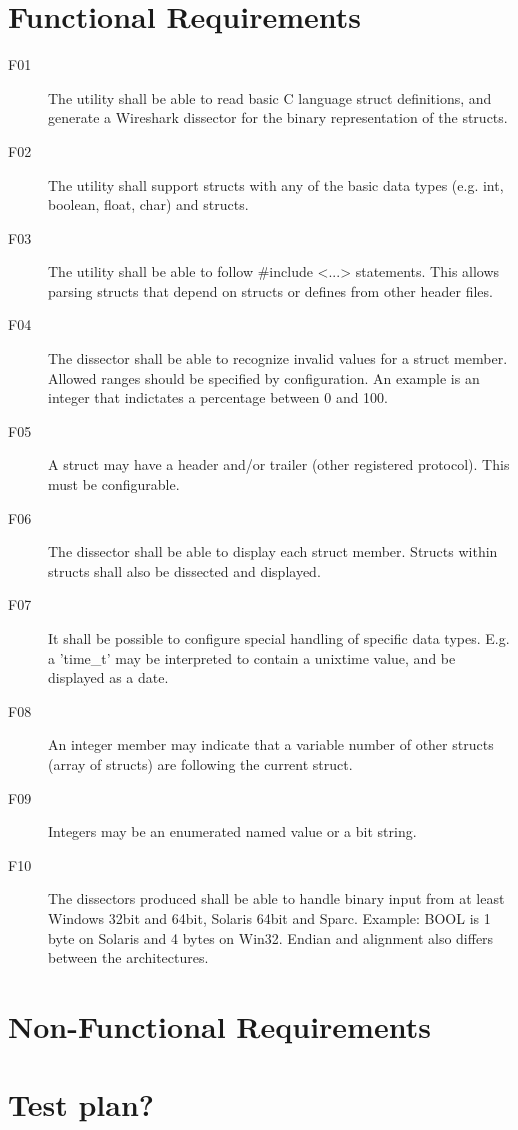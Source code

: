 \chapter{Functional Requirements}
\begin{description}
	\item[F01] The utility shall be able to read basic C language struct
		definitions, and generate a Wireshark dissector for the binary
		representation of the structs.
	\item[F02] The utility shall support structs with any of the basic data
		types (e.g. int, boolean, float, char) and structs.
	\item[F03] The utility shall be able to follow \#include <...> statements.
		This allows parsing structs that depend on structs or defines from
		other header files.
	\item[F04] The dissector shall be able to recognize invalid values for a
		struct member. Allowed ranges should be specified by configuration. An
		example is an integer that indictates a percentage between 0 and 100.
	\item[F05] A struct may have a header and/or trailer (other registered
		protocol). This must be configurable.
	\item[F06] The dissector shall be able to display each struct member.
		Structs within structs shall also be dissected and displayed.
	\item[F07] It shall be possible to configure special handling of specific
		data types. E.g. a 'time\_t' may be interpreted to contain a unixtime
		value, and be displayed as a date.
	\item[F08] An integer member may indicate that a variable number of other
		structs (array of structs) are following the current struct.
	\item[F09] Integers may be an enumerated named value or a bit string.
	\item[F10] The dissectors produced shall be able to handle binary input
		from at least Windows 32bit and 64bit, Solaris 64bit and Sparc.
		Example: BOOL is 1 byte on Solaris and 4 bytes on Win32. Endian and
		alignment also differs between the architectures.
\end{description}

\chapter{Non-Functional Requirements}

\chapter{Test plan?}

